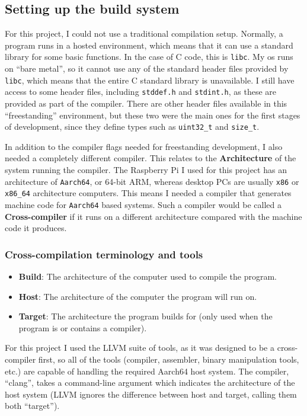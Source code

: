 \documentclass{article}
\begin{document}
\subsection{Setting up the build system}
For this project, I could not use a traditional compilation setup. Normally, a
program runs in a hosted environment, which means that it can use a standard
library for some basic functions. In the case of C code, this is \texttt{libc}.
My \gls{os} runs on ``bare metal'', so it cannot use any of the standard header
files provided by \texttt{libc}, which means that the entire C standard library
is unavailable. I still have access to some header files, including
\texttt{stddef.h} and \texttt{stdint.h}, as these are provided as part of the
compiler. There are other header files available in this ``freestanding''
environment, but these two were the main ones for the first stages of
development, since they define types such as \texttt{uint32\_t} and
\texttt{size\_t}.

In addition to the compiler flags needed for freestanding development, I also
needed a completely different compiler. This relates to the
\textbf{Architecture} of the system running the compiler. The Raspberry Pi I
used for this project has an architecture of \texttt{Aarch64}, or 64-bit ARM,
whereas desktop PCs are usually \texttt{x86} or \texttt{x86\_64} architecture
computers. This means I needed a compiler that generates machine code for
\texttt{Aarch64} based systems. Such a compiler would be called a
\textbf{Cross-compiler} if it runs on a different architecture compared with
the machine code it produces.
\subsubsection{Cross-compilation terminology and tools}
\begin{itemize}
    \item \textbf{Build}: The architecture of the computer used to compile the
        program.
    \item \textbf{Host}: The architecture of the computer the program will run
        on.
    \item \textbf{Target}: The architecture the program builds for (only used
        when the program is or contains a compiler).
\end{itemize}
For this project I used the LLVM suite of tools, as it was designed to be a
cross-compiler first, so all of the tools (compiler, assembler, binary
manipulation tools, etc.) are capable of handling the required Aarch64 host
system. The compiler, ``clang'', takes a command-line argument which indicates
the architecture of the host system (LLVM ignores the difference between host
and target, calling them both ``target'').
\end{document}

